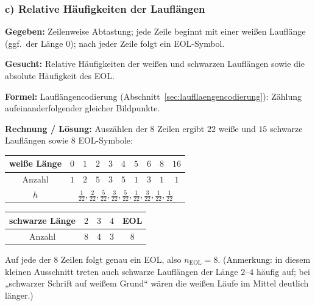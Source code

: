 \subsubsection*{c) Relative Häufigkeiten der Lauflängen}

\begin{beispiel}

\textbf{Gegeben:} Zeilenweise Abtastung; jede Zeile beginnt mit einer weißen
Lauflänge (ggf.\ der Länge $0$); nach jeder Zeile folgt ein EOL-Symbol.

\textbf{Gesucht:} Relative Häufigkeiten der weißen und schwarzen Lauflängen
sowie die absolute Häufigkeit des EOL.

\textbf{Formel:} Lauflängencodierung (Abschnitt~\ref{sec:laufllaengencodierung}):
Zählung aufeinanderfolgender gleicher Bildpunkte.

\textbf{Rechnung / Lösung:} Auszählen der $8$ Zeilen ergibt $22$ weiße und
$15$ schwarze Lauflängen sowie $8$ EOL-Symbole:

\begin{center}
\begin{tabular}{c|ccccccccc}
weiße Länge & $0$ & $1$ & $2$ & $3$ & $4$ & $5$ & $6$ & $8$ & $16$ \\
\hline
Anzahl & $1$ & $2$ & $5$ & $3$ & $5$ & $1$ & $3$ & $1$ & $1$ \\
$h$ & \multicolumn{9}{c}{$\tfrac{1}{22},\tfrac{2}{22},\tfrac{5}{22},\tfrac{3}{22},\tfrac{5}{22},\tfrac{1}{22},\tfrac{3}{22},\tfrac{1}{22},\tfrac{1}{22}$} \\
\end{tabular}
\end{center}

\begin{center}
\begin{tabular}{c|ccc|c}
schwarze Länge & $2$ & $3$ & $4$ & EOL \\
\hline
Anzahl & $8$ & $4$ & $3$ & $8$ \\
\end{tabular}
\end{center}

Auf jede der $8$ Zeilen folgt genau ein EOL, also $\boxed{n_{\text{EOL}} = 8}$.
(Anmerkung: in diesem kleinen Ausschnitt treten auch schwarze Lauflängen der
Länge $2$--$4$ häufig auf; bei „schwarzer Schrift auf weißem Grund`` wären die
weißen Läufe im Mittel deutlich länger.)

\end{beispiel}

